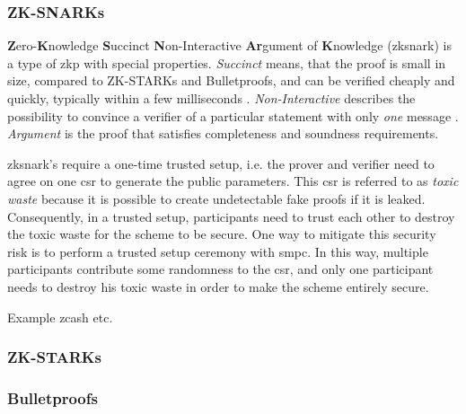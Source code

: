 
\subsubsection{ZK-SNARKs}
\label{subsubsec:zksnarks}

\textbf{Z}ero-\textbf{K}nowledge \textbf{S}uccinct \textbf{N}on-Interactive \textbf{Ar}gument of \textbf{K}nowledge (\acrshort{zksnark}) is a type of \acrshort{zkp} with special properties. \emph{Succinct} means, that the proof is small in size, compared to ZK-STARKs and Bulletproofs, and can be verified cheaply and quickly, typically within a few milliseconds \cite{simunicVerifiableComputingApplications2021}. \emph{Non-Interactive} describes the possibility to convince a verifier of a particular statement with only \emph{one} message \cite{eberhardtOffchainingModelsApproaches2018,eberhardtZoKratesScalablePrivacyPreserving2018a,simunicVerifiableComputingApplications2021}. \emph{Argument} is the proof that satisfies completeness and soundness requirements.

\acrshort{zksnark}'s require a one-time trusted setup, i.e. the prover and verifier need to agree on one \acrfull{csr} to generate the public parameters. This \acrshort{csr} is referred to as \emph{toxic waste} because it is possible to create undetectable fake proofs if it is leaked. Consequently, in a trusted setup, participants need to trust each other to destroy the toxic waste for the scheme to be secure. One way to mitigate this security risk is to perform a trusted setup ceremony with \acrfull{smpc}. In this way, multiple participants contribute some randomness to the \acrshort{csr}, and only one participant needs to destroy his toxic waste in order to make the scheme entirely secure.

Example zcash etc.

\subsubsection{ZK-STARKs}
\label{subsubsec:zkstarks}

\subsubsection{Bulletproofs}
\label{subsubsec:bulletproofs}